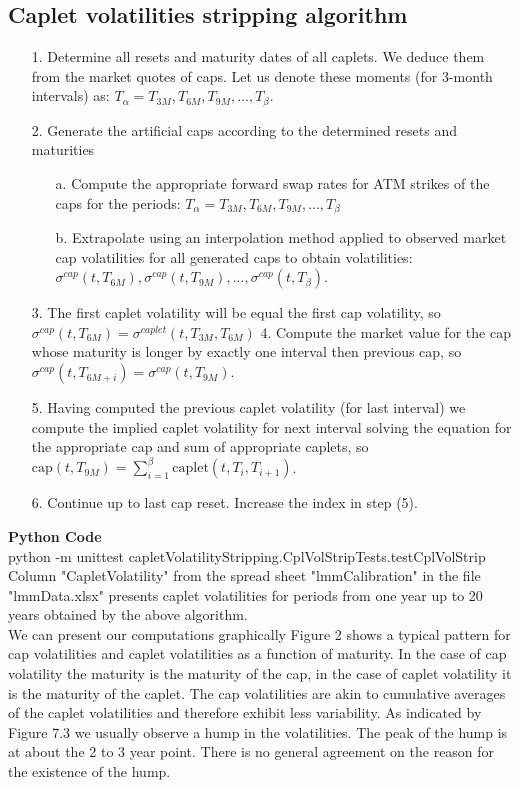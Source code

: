 \documentclass[11pt]{article}
\numberwithin{equation}{subsection}
\begin{document}
\subsection*{Caplet volatilities stripping algorithm}
\begin{enumerate}
	\item [1.] Determine all resets and maturity dates of all caplets. We deduce them from the market
	quotes of caps. Let us denote these moments (for 3-month intervals) as: 
	\(T_{\alpha}=T_{3M}, T_{6M}, T_{9M}, ...,T_{\beta}\).
	\item [2.] Generate the artificial caps according to the determined resets and maturities
	\begin{enumerate}
		\item [a.] Compute the appropriate forward swap rates for ATM strikes of the caps for the
		periods: \(T_{\alpha}=T_{3M}, T_{6M}, T_{9M}, ...,T_{\beta}\)
		\item [b.] Extrapolate using an interpolation method applied to observed market
		cap volatilities for all generated caps to obtain volatilities:
		\(\sigma^{cap}(t, T_{6M}), \sigma^{cap}(t, T_{9M}),..., \sigma^{cap}(t, T_{\beta})\).
	\end{enumerate}
	\item [3.] The first caplet volatility will be equal the first cap volatility, so \(\sigma^{cap}(t, T_{6M}) = \sigma^{caplet}(t, T_{3M}, T_{6M})\)
	4. Compute the market value for the cap whose maturity is longer by exactly one interval
	then previous cap, so \(\sigma^{cap}(t, T_{6M+i}) = \sigma^{cap}(t, T_{9M})\).
	\item [5.] Having computed the previous caplet volatility (for last interval) we compute the implied caplet volatility for next interval solving the equation for the appropriate cap and sum of appropriate caplets, so \(\text{cap}(t, T_{9M}) = \sum_{i=1}^{\beta} \text{caplet}(t, T_{i}, T_{i+1})\).
	\item [6.] Continue up to last cap reset. Increase the index in step (5).
\end{enumerate}
\textbf{Python Code}\\
python -m unittest capletVolatilityStripping.CplVolStripTests.testCplVolStrip\\
Column "CapletVolatility" from the spread sheet "lmmCalibration" in the file "lmmData.xlsx" presents caplet volatilities for periods from one year up to 20 years obtained by the above algorithm.\\
We can present our computations graphically Figure 2 shows a typical pattern for cap volatilities and caplet volatilities as a function of maturity. In the case of cap volatility the maturity is the maturity of the cap, in the case of caplet volatility it is the maturity of the caplet. The cap volatilities are akin to cumulative
averages of the caplet volatilities and therefore exhibit less variability. As indicated by
Figure 7.3 we usually observe a hump in the volatilities. The peak of the hump is at about
the 2 to 3 year point. There is no general agreement on the reason for the existence of the hump.
\end{document}
